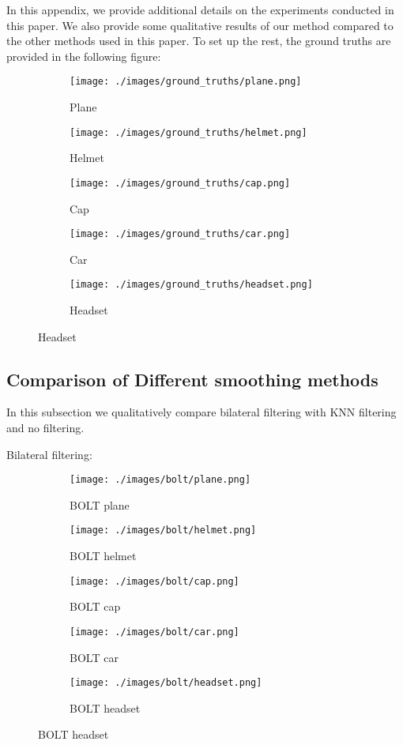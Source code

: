 In this appendix, we provide additional details on the experiments conducted in this paper.
We also provide some qualitative results of our method compared to the other methods used in this paper.
To set up the rest, the ground truths are provided in the following figure:

\begin{figure}[H]
	\centering
	\begin{subfigure}{0.18\textwidth}
		\texttt{[image: ./images/ground\_truths/plane.png]}
		\caption{Plane}
	\end{subfigure}
	\begin{subfigure}{0.18\textwidth}
		\texttt{[image: ./images/ground\_truths/helmet.png]}
		\caption{Helmet}
	\end{subfigure}
	\begin{subfigure}{0.18\textwidth}
		\texttt{[image: ./images/ground\_truths/cap.png]}
		\caption{Cap}
	\end{subfigure}
	\begin{subfigure}{0.18\textwidth}
		\texttt{[image: ./images/ground\_truths/car.png]}
		\caption{Car}
	\end{subfigure}
	\begin{subfigure}{0.18\textwidth}
		\texttt{[image: ./images/ground\_truths/headset.png]}
		\caption{Headset}
	\end{subfigure}
\end{figure}

\subsection{Comparison of Different smoothing methods}

In this subsection we qualitatively compare bilateral filtering with KNN filtering and no filtering.

Bilateral filtering:


\begin{figure}[H]
	\centering
	\begin{subfigure}{0.18\textwidth}
		\texttt{[image: ./images/bolt/plane.png]}
		\caption{BOLT plane}
	\end{subfigure}
	\begin{subfigure}{0.18\textwidth}
		\texttt{[image: ./images/bolt/helmet.png]}
		\caption{BOLT helmet}
	\end{subfigure}
	\begin{subfigure}{0.18\textwidth}
		\texttt{[image: ./images/bolt/cap.png]}
		\caption{BOLT cap}
	\end{subfigure}
	\begin{subfigure}{0.18\textwidth}
		\texttt{[image: ./images/bolt/car.png]}
		\caption{BOLT car}
	\end{subfigure}
	\begin{subfigure}{0.18\textwidth}
		\texttt{[image: ./images/bolt/headset.png]}
		\caption{BOLT headset}
	\end{subfigure}
\end{figure}

